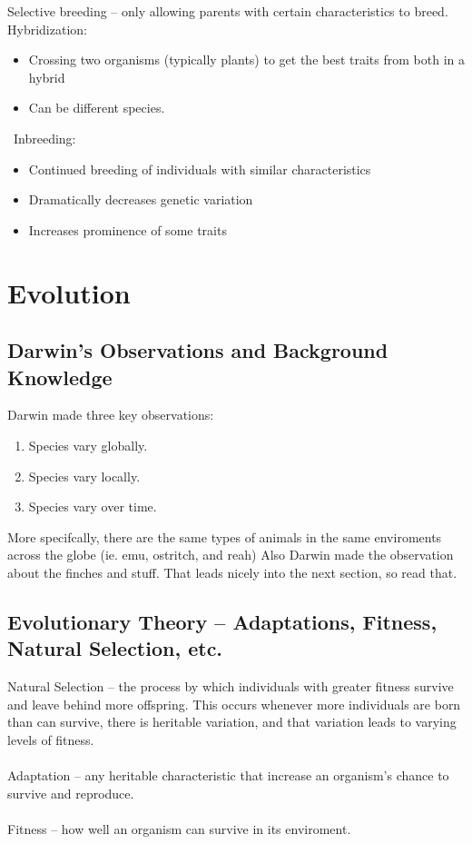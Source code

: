 \documentclass{article}
\begin{document}
Selective breeding -- only allowing parents with certain characteristics to breed.\\
Hybridization:
\begin{itemize}
\item Crossing two organisms (typically plants) to get the best traits from both in a hybrid
\item Can be different species.
\end{itemize}\
Inbreeding:
\begin{itemize}
\item Continued breeding of individuals with similar characteristics
\item Dramatically decreases genetic variation
\item Increases prominence of some traits
\end{itemize}

\section{Evolution} %

\subsection{Darwin's Observations and Background Knowledge}
Darwin made three key observations:
\begin{enumerate}
\item Species vary globally.
\item Species vary locally.
\item Species vary over time.
\end{enumerate}
More specifcally, there are the same types of animals in the same enviroments across the globe (ie. emu, ostritch, and reah)
Also Darwin made the observation about the finches and stuff.
That leads nicely into the next section, so read that.

\subsection{Evolutionary Theory -- Adaptations, Fitness, Natural Selection, etc.}
Natural Selection -- the process by which individuals with greater fitness survive and leave behind more offspring.
This occurs whenever more individuals are born than can survive, there is heritable variation, and that variation leads to varying levels of fitness.\\
\\
Adaptation -- any heritable characteristic that increase an organism's chance to survive and reproduce.\\
\\
Fitness -- how well an organism can survive in its enviroment.
\end{document}
